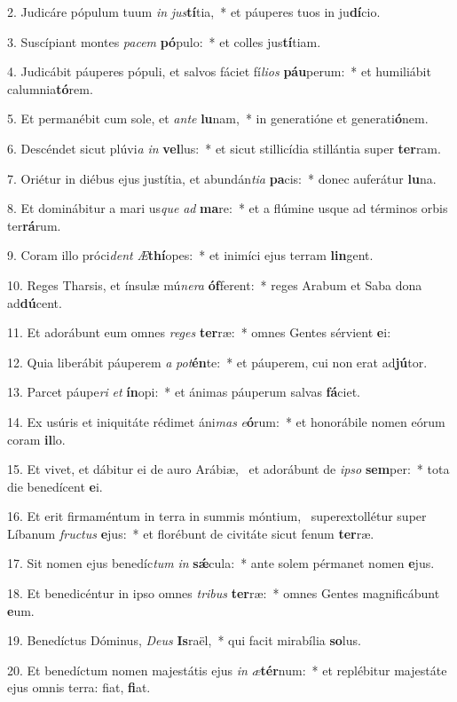 2. Judicáre pópulum tuum \textit{in} \textit{jus}\textbf{tí}tia,~*  et páuperes tuos in ju\textbf{dí}cio.\

3. Suscípiant montes \textit{pa}\textit{cem} \textbf{pó}pulo:~*  et colles jus\textbf{tí}tiam.\

4. Judicábit páuperes pópuli, et salvos fáciet fí\textit{li}\textit{os} \textbf{páu}perum:~*  et humiliábit calumnia\textbf{tó}rem.\

5. Et permanébit cum sole, et \textit{an}\textit{te} \textbf{lu}nam,~*  in generatióne et generati\textbf{ó}nem.\

6. Descéndet sicut plúvi\textit{a} \textit{in} \textbf{vel}lus:~*  et sicut stillicídia stillántia super \textbf{ter}ram.\

7. Oriétur in diébus ejus justítia, et abundán\textit{ti}\textit{a} \textbf{pa}cis:~*  donec auferátur \textbf{lu}na.\

8. Et dominábitur a mari us\textit{que} \textit{ad} \textbf{ma}re:~*  et a flúmine usque ad términos orbis ter\textbf{rá}rum.\

9. Coram illo próci\textit{dent} \textit{Æ}\textbf{thí}opes:~*  et inimíci ejus terram \textbf{lin}gent.\

10. Reges Tharsis, et ínsulæ mú\textit{ne}\textit{ra} \textbf{óf}ferent:~*  reges Arabum et Saba dona ad\textbf{dú}cent.\

11. Et adorábunt eum omnes \textit{re}\textit{ges} \textbf{ter}ræ:~*  omnes Gentes sérvient \textbf{e}i:\

12. Quia liberábit páuperem \textit{a} \textit{pot}\textbf{én}te:~*  et páuperem, cui non erat ad\textbf{jú}tor.\

13. Parcet páupe\textit{ri} \textit{et} \textbf{ín}opi:~*  et ánimas páuperum salvas \textbf{fá}ciet.\

14. Ex usúris et iniquitáte rédimet áni\textit{mas} \textit{e}\textbf{ó}rum:~*  et honorábile nomen eórum coram \textbf{il}lo.\

15. Et vivet, et dábitur ei de auro Arábiæ, \dag\  et adorábunt de \textit{ip}\textit{so} \textbf{sem}per:~*  tota die benedícent \textbf{e}i.\

16. Et erit firmaméntum in terra in summis móntium, \dag\  superextollétur super Líbanum \textit{fruc}\textit{tus} \textbf{e}jus:~*  et florébunt de civitáte sicut fenum \textbf{ter}ræ.\

17. Sit nomen ejus benedíc\textit{tum} \textit{in} \textbf{sǽ}cula:~*  ante solem pérmanet nomen \textbf{e}jus.\

18. Et benedicéntur in ipso omnes \textit{tri}\textit{bus} \textbf{ter}ræ:~*  omnes Gentes magnificábunt \textbf{e}um.\

19. Benedíctus Dóminus, \textit{De}\textit{us} \textbf{Is}raël,~*  qui facit mirabília \textbf{so}lus.\

20. Et benedíctum nomen majestátis ejus \textit{in} \textit{æ}\textbf{tér}num:~*  et replébitur majestáte ejus omnis terra: fiat, \textbf{fi}at.\

